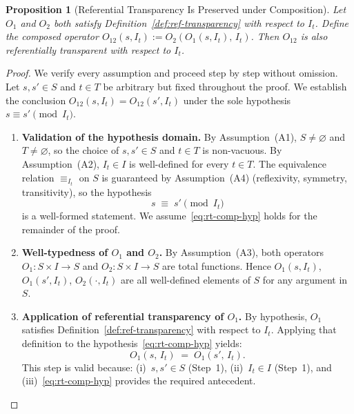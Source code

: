 \documentclass[12pt,openany]{book}
\newcommand{\calI}{\mathcal{I}}
\numberwithin{equation}{chapter}
\theoremstyle{plain}
\newtheorem{proposition}[theorem]{Proposition}
\theoremstyle{definition}
\theoremstyle{remark}
\numberwithin{equation}{chapter}
\theoremstyle{plain}
\newcommand{\calS}{\mathcal{S}}
\newcommand{\calT}{\mathcal{T}}
\def\calI{I}%
\def\calS{S}%
\def\calT{T}%
\begin{document}
\begin{proposition}[Referential Transparency Is Preserved under
  Composition]
\label{prop:rt-composition}
Let $O_1$ and $O_2$ both satisfy Definition~\ref{def:ref-transparency}
with respect to $\calI_t$.  Define the composed operator
$O_{12}(s, \calI_t) := O_2(O_1(s, \calI_t),\, \calI_t)$.
Then $O_{12}$ is also referentially transparent with respect to
$\calI_t$.
\end{proposition}

\begin{proof}
We verify every assumption and proceed step by step without omission.
Let $s, s' \in \calS$ and $t \in \calT$ be arbitrary but fixed
throughout the proof.  We establish the conclusion
$O_{12}(s,\calI_t) = O_{12}(s',\calI_t)$ under the sole hypothesis
$s \equiv s' \pmod{\calI_t}$.

\begin{enumerate}

  \item \textbf{Validation of the hypothesis domain.}
        By Assumption~(A1), $\calS \neq \varnothing$ and
        $\calT \neq \varnothing$, so the choice of $s, s' \in \calS$
        and $t \in \calT$ is non-vacuous.  By Assumption~(A2),
        $\calI_t \in \calI$ is well-defined for every $t \in \calT$.
        The equivalence relation $\equiv_{\calI_t}$ on $\calS$ is
        guaranteed by Assumption~(A4) (reflexivity, symmetry,
        transitivity), so the hypothesis
        \begin{equation}
          s \;\equiv\; s' \pmod{\calI_t}
          \label{eq:rt-comp-hyp}
        \end{equation}
        is a well-formed statement.  We assume~\eqref{eq:rt-comp-hyp}
        holds for the remainder of the proof.

  \item \textbf{Well-typedness of $O_1$ and $O_2$.}
        By Assumption~(A3), both operators
        $O_1 : \calS \times \calI \to \calS$ and
        $O_2 : \calS \times \calI \to \calS$ are total functions.
        Hence $O_1(s, \calI_t)$, $O_1(s', \calI_t)$,
        $O_2(\cdot, \calI_t)$ are all well-defined elements of
        $\calS$ for any argument in $\calS$.

  \item \textbf{Application of referential transparency of $O_1$.}
        By hypothesis, $O_1$ satisfies
        Definition~\ref{def:ref-transparency} with respect to
        $\calI_t$.  Applying that definition to the
        hypothesis~\eqref{eq:rt-comp-hyp} yields:
        \begin{equation}
          O_1(s,\, \calI_t)
          \;=\;
          O_1(s',\, \calI_t).
          \label{eq:rt-comp-step1}
        \end{equation}
        This step is valid because: (i)~$s, s' \in \calS$ (Step~1),
        (ii)~$\calI_t \in \calI$ (Step~1), and
        (iii)~\eqref{eq:rt-comp-hyp} provides the required antecedent.


\end{enumerate}
\end{proof}
\end{document}
